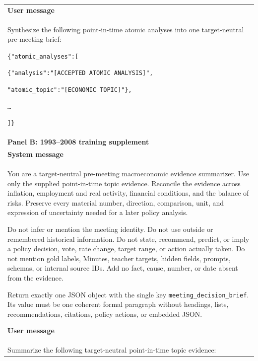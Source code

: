 \begin{center}
\begin{singlespace}
\begin{footnotesize}
\begin{longtable}{@{}p{}@{}}
    \textbf{User message} \\[2pt]

    Synthesize the following point-in-time atomic analyses into one
    target-neutral pre-meeting brief:
    \par\medskip

    \texttt{\{"atomic\_analyses":[}
    \par
    \texttt{\quad\{"analysis":"[ACCEPTED ATOMIC ANALYSIS]",}
    \par
    \texttt{\qquad"atomic\_topic":"[ECONOMIC TOPIC]"\},}
    \par
    \texttt{\quad\ldots}
    \par
    \texttt{]\}}
    \\[8pt]

    \midrule

    \textbf{Panel B: 1993--2008 training supplement} \\[3pt]

    \textbf{System message} \\[2pt]

    You are a target-neutral pre-meeting macroeconomic evidence summarizer.
    Use only the supplied point-in-time topic evidence. Reconcile the evidence
    across inflation, employment and real activity, financial conditions, and
    the balance of risks. Preserve every material number, direction,
    comparison, unit, and expression of uncertainty needed for a later policy
    analysis.
    \par\medskip

    Do not infer or mention the meeting identity. Do not use outside or
    remembered historical information. Do not state, recommend, predict, or
    imply a policy decision, vote, rate change, target range, or action actually
    taken. Do not mention gold labels, Minutes, teacher targets, hidden fields,
    prompts, schemas, or internal source IDs. Add no fact, cause, number, or
    date absent from the evidence.
    \par\medskip

    Return exactly one JSON object with the single key
    \texttt{meeting\_decision\_brief}. Its value must be one coherent formal
    paragraph without headings, lists, recommendations, citations, policy
    actions, or embedded JSON.
    \par\medskip

    \textbf{User message} \\[2pt]

    Summarize the following target-neutral point-in-time topic evidence:
    \par\medskip


\end{longtable}
\end{footnotesize}
\end{singlespace}
\end{center}
